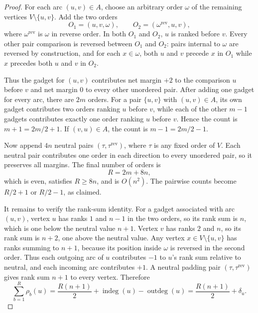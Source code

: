 \documentclass[11pt]{article}
\newcommand{\rev}{\operatorname{rev}}
\newcommand{\indeg}{\operatorname{indeg}}
\newcommand{\outdeg}{\operatorname{outdeg}}
\begin{document}
\begin{proof}
For each arc $(u,v)\in A$, choose an arbitrary order $\omega$ of the remaining vertices $V\setminus\{u,v\}$.  Add the two orders
\begin{equation}
  O_1=(u,v,\omega),\qquad O_2=(\omega^{\rev},u,v),
\end{equation}
where $\omega^{\rev}$ is $\omega$ in reverse order.  In both $O_1$ and $O_2$, $u$ is ranked before $v$.  Every other pair comparison is reversed between $O_1$ and $O_2$: pairs internal to $\omega$ are reversed by construction, and for each $x\in\omega$, both $u$ and $v$ precede $x$ in $O_1$ while $x$ precedes both $u$ and $v$ in $O_2$.

Thus the gadget for $(u,v)$ contributes net margin $+2$ to the comparison $u$ before $v$ and net margin $0$ to every other unordered pair.  After adding one gadget for every arc, there are $2m$ orders.  For a pair $\{u,v\}$ with $(u,v)\in A$, its own gadget contributes two orders ranking $u$ before $v$, while each of the other $m-1$ gadgets contributes exactly one order ranking $u$ before $v$.  Hence the count is $m+1=2m/2+1$.  If $(v,u)\in A$, the count is $m-1=2m/2-1$.

Now append $4n$ neutral pairs $(\tau,\tau^{\rev})$, where $\tau$ is any fixed order of $V$.  Each neutral pair contributes one order in each direction to every unordered pair, so it preserves all margins.  The final number of orders is
\begin{equation}
  R=2m+8n,
\end{equation}
which is even, satisfies $R\ge 8n$, and is $O(n^2)$.  The pairwise counts become $R/2+1$ or $R/2-1$, as claimed.

It remains to verify the rank-sum identity.  For a gadget associated with arc $(u,v)$, vertex $u$ has ranks $1$ and $n-1$ in the two orders, so its rank sum is $n$, which is one below the neutral value $n+1$.  Vertex $v$ has ranks $2$ and $n$, so its rank sum is $n+2$, one above the neutral value.  Any vertex $x\in V\setminus\{u,v\}$ has ranks summing to $n+1$, because its position inside $\omega$ is reversed in the second order.  Thus each outgoing arc of $u$ contributes $-1$ to $u$'s rank sum relative to neutral, and each incoming arc contributes $+1$.  A neutral padding pair $(\tau,\tau^{\rev})$ gives rank sum $n+1$ to every vertex.  Therefore
\begin{equation}
  \sum_{b=1}^R \rho_b(u)
  =\frac{R(n+1)}2+\indeg(u)-\outdeg(u)
  =\frac{R(n+1)}2+\delta_u.
\end{equation}
\end{proof}
\end{document}
